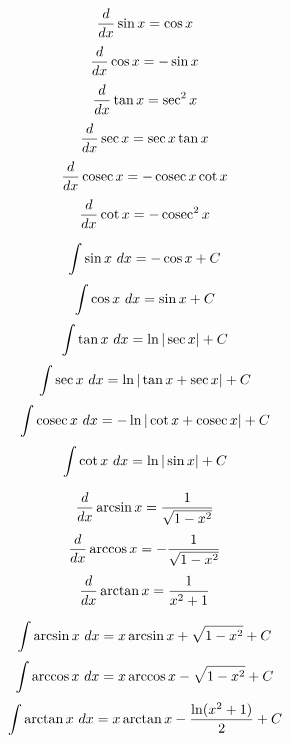 \documentclass[../main.tex]{subfile}
\begin{document}
\begin{figure}[h]
\centering
\large
\begin{minipage}{0.49\linewidth}
	$$\frac{d}{d x}\sin x = \cos x$$
	\vspace{0.5em}
	$$\frac{d}{d x}\cos x = -\sin x$$
	\vspace{0.5em}
	$$\frac{d}{d x}\tan x = \sec^2 x$$
	\vspace{0.5em}
	$$\frac{d}{d x}\sec x = \sec x\tan x$$
	\vspace{0.5em}
	$$\frac{d}{d x}\mathop{\rm cosec}\nolimits x = -\mathop{\rm cosec}\nolimits x\cot x$$
	\vspace{0.5em}
	$$\frac{d}{d x}\cot x = -\mathop{\rm cosec}\nolimits^2 x$$
\end{minipage}\hfill
\begin{minipage}{0.49\linewidth}
	$$\int \sin x \ d x = -\cos x + C$$
	\vspace{0.5em}
	$$\int \cos x \ d x = \sin x + C$$
	\vspace{0.5em}
	$$\int \tan x \ d x = \ln|\sec x| + C$$
	\vspace{0.5em}
	$$\int \sec x \ d x = \ln|\tan x + \sec x| + C$$
	\vspace{0.5em}
	$$\int \mathop{\rm cosec}\nolimits x \ d x = -\ln|\cot x + \mathop{\rm cosec}\nolimits x| + C$$
	\vspace{0.5em}
	$$\int \cot x \ d x = \ln|\sin x| + C$$
\end{minipage}
\end{figure}

\begin{figure}[h]
\centering
\large
\begin{minipage}{0.49\linewidth}
	$$\frac{d}{d x}\arcsin x = \frac{1}{\sqrt{1 - x^2}}$$
	\vspace{0.5em}
	$$\frac{d}{d x}\arccos x = -\frac{1}{\sqrt{1 - x^2}}$$
	\vspace{0.5em}
	$$\frac{d}{d x}\arctan x = \frac{1}{x^2 + 1}$$
\end{minipage}\hfill
\begin{minipage}{0.49\linewidth}
	$$\int \arcsin x \ d x = x \arcsin x + \sqrt{1 - x^2} + C$$
	\vspace{0.5em}
	$$\int \arccos x \ d x = x \arccos x - \sqrt{1 - x^2} + C$$
	\vspace{0.5em}
	$$\int \arctan x \ d x = x \arctan x - \frac{\ln(x^2 + 1)}{2} + C$$
\end{minipage}
\end{figure}

\newpage

\vspace{-2.5em}

\end{document}
